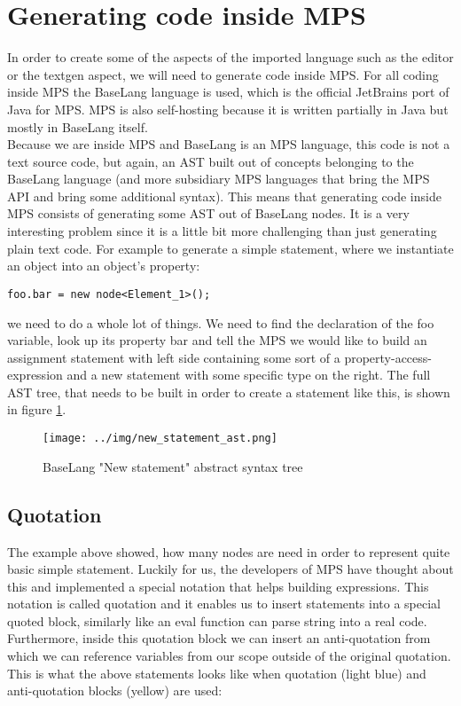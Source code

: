 \section{Generating code inside MPS}
\label{chap:generating_code_inside_mps}

In order to create some of the aspects of the imported language such as the editor or the textgen aspect, we will need to generate code inside MPS. For all coding inside MPS the BaseLang language is used, which is the official JetBrains port of Java for MPS. MPS is also self-hosting because it is written partially in Java but mostly in BaseLang itself.
\\

Because we are inside MPS and BaseLang is an MPS language, this code is not a text source code, but again, an AST built out of concepts belonging to the BaseLang language (and more subsidiary MPS languages that bring the MPS API and bring some additional syntax). This means that generating code inside MPS consists of generating some AST out of BaseLang nodes. It is a very interesting problem since it is a little bit more challenging than just generating plain text code. For example to generate a simple statement, where we instantiate an object into an object's property:

\begin{center}
	\texttt{foo.bar = new node<Element{\_}1>();}
\end{center}

\noindent
we need to do a whole lot of things. We need to find the declaration of the foo variable, look up its property bar and tell the MPS we would like to build an assignment statement with left side containing some sort of a property-access-expression and a new statement with some specific type on the right. The full AST tree, that needs to be built in order to create a statement like this, is shown in figure \ref{fig:new_ast}.

\begin{figure}[h]
	\centering
	\hspace*{-18mm}
	\texttt{[image: ../img/new\_statement\_ast.png]}
	\caption{BaseLang "New statement" abstract syntax tree}
	\label{fig:new_ast}
\end{figure}

\subsection{Quotation}
The example above showed, how many nodes are need in order to represent quite basic simple statement. Luckily for us, the developers of MPS have thought about this and implemented a special notation that helps building expressions. This notation is called quotation and it enables us to insert statements into a special quoted block, similarly like an eval function can parse string into a real code. Furthermore, inside this quotation block we can insert an anti-quotation from which we can reference variables from our scope outside of the original quotation. This is what the above statements looks like when quotation (light blue) and anti-quotation blocks (yellow) are used:

